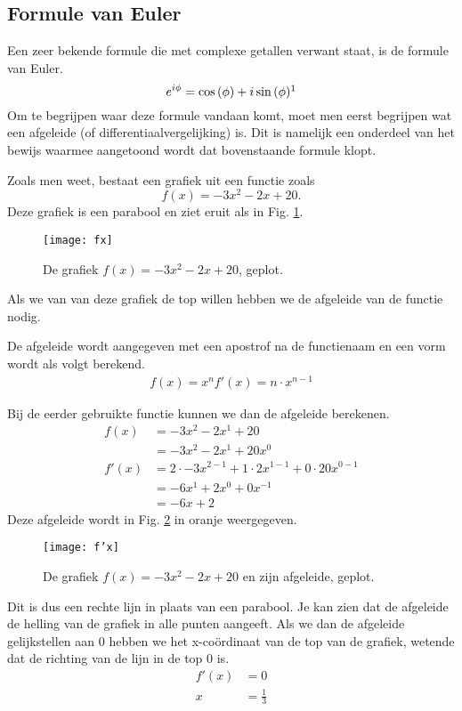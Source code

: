 \documentclass[11pt,fleqn]{book} %
\begin{document}
\subsection{Formule van Euler}
Een zeer bekende formule die met complexe getallen verwant staat, is de formule van Euler.
\begin{equation}\label{eq:euler}
e^{i\phi}=\cos{(\phi)}+i\sin{(\phi)}\footnotemark
\end{equation}
Om te begrijpen waar deze formule vandaan komt, moet men eerst begrijpen wat een afgeleide (of differentiaalvergelijking) is. Dit is namelijk een onderdeel van het bewijs waarmee aangetoond wordt dat bovenstaande formule klopt.

Zoals men weet, bestaat een grafiek uit een functie zoals
\begin{displaymath}
f(x)=-3x^2-2x+20.
\end{displaymath}
Deze grafiek is een parabool en ziet eruit als in Fig. \ref{fig:fx3}.
\begin{figure}[h]
	\centering\texttt{[image: fx]}
	\caption{De grafiek $f(x)=-3x^2-2x+20$, geplot.}
	\label{fig:fx3}
\end{figure}
Als we van van deze grafiek de top willen hebben we de afgeleide van de functie nodig.
\begin{definition}
De afgeleide wordt aangegeven met een apostrof na de functienaam en een vorm wordt als volgt berekend.
\begin{align}
f(x)=x^n
f'(x)=n\cdot x^{n-1}
\end{align}
\end{definition}
Bij de eerder gebruikte functie kunnen we dan de afgeleide berekenen.
\begin{align*}
f(x) &=-3x^2-2x^1+20\\
&=-3x^2-2x^1+20x^0\\
f'(x) &= 2\cdot -3x^{2-1}+1\cdot 2x^{1-1}+0\cdot 20x^{0-1}\\
&=-6x^1+2x^0 +0x^{-1}\\
&=-6x+2
\end{align*}
Deze afgeleide wordt in Fig. \ref{fig:f'x} in oranje weergegeven.
\begin{figure}[h]
	\centering\texttt{[image: f'x]}
	\caption{De grafiek $f(x)=-3x^2-2x+20$ en zijn afgeleide, geplot.}
	\label{fig:f'x}
\end{figure}

Dit is dus een rechte lijn in plaats van een parabool. Je kan zien dat de afgeleide de helling van de grafiek in alle punten aangeeft. Als we dan de afgeleide gelijkstellen aan 0 hebben we het x-coördinaat van de top van de grafiek, wetende dat de richting van de lijn in de top 0 is.
\begin{align*}
f'(x) &= 0\\
x &= \frac{1}{3}
\end{align*}
\end{document}

